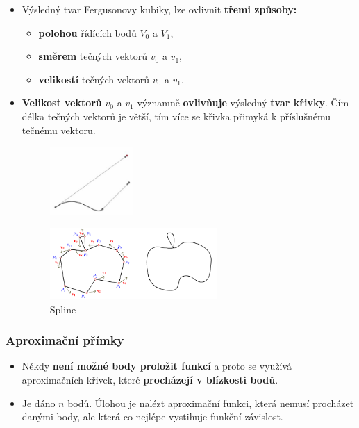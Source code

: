 \begin{itemize}
\item \noindent Výsledný tvar Fergusonovy kubiky, lze ovlivnit \textbf{třemi způsoby:}
\begin{itemize}
	\item \textbf{polohou} řídících bodů $V_0$ a $V_1$,
	\item \textbf{směrem} tečných vektorů $v_0$ a $v_1$,
	\item \textbf{velikostí} tečných vektorů $v_0$ a $v_1$.
\end{itemize}
\item \textbf{Velikost vektorů} $v_0$ a $v_1$ významně \textbf{ovlivňuje} výsledný \textbf{tvar křivky}. Čím délka tečných vektorů je větší, tím více se křivka přimyká k příslušnému tečnému vektoru.
\begin{figure}[H]
\centering
\includegraphics[width=0.3\textwidth]{assets/3_ferg_krivka}
\end{figure}
\begin{figure}[H]
\centering
\includegraphics[width=0.6\textwidth]{assets/3_ferg_spline}
\caption{Spline}
\end{figure}
\end{itemize}


\subsubsection{Aproximační přímky}
\begin{itemize}
\item Někdy \textbf{není možné body proložit funkcí} a proto se využívá aproximačních křivek, které \textbf{procházejí v blízkosti bodů}.
\item Je dáno $n$ bodů. Úlohou je nalézt aproximační funkci, která nemusí procházet danými body, ale která co nejlépe vystihuje funkční závislost. 
\end{itemize}

